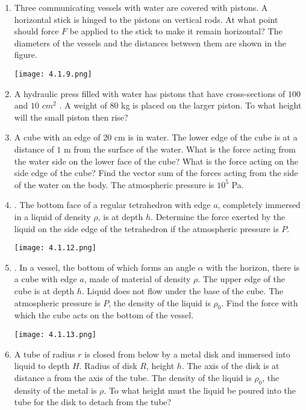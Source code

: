 \documentclass{article}
\begin{document}
\begin{enumerate}[label=4.1.\arabic*]
\item Three communicating vessels with water are covered with pistons. A horizontal stick is hinged to the pistons on vertical rods. At what point should force $F$ be applied to the stick to make it remain horizontal? The diameters of the vessels and the distances between them are shown in the figure. 
\begin{center}
    \texttt{[image: 4.1.9.png]}
\end{center}

\item A hydraulic press filled with water has pistons that have cross-sections of $100$ and $10$ $cm^2$ . A weight of $80$ kg is placed on the larger piston. To what height will the small piston then rise?  




\item A cube with an edge of $20$ cm is in water. The lower edge of the cube is at a distance of $1$ m from the surface of the water. What is the force acting from the water side on the lower face of the cube? What is the force acting on the side edge of the cube? Find the vector sum of the forces acting from the side of the water on the body. The atmospheric pressure is $10^5$ Pa.    
\item . The bottom face of a regular tetrahedron with edge $a$, completely immersed in a liquid of density $\rho$, is at depth $h$. Determine the force exerted by the liquid on the side edge of the tetrahedron if the atmospheric pressure is $P$. 
\begin{center}
    \texttt{[image: 4.1.12.png]}
\end{center}
\item . In a vessel, the bottom of which forms an angle $\alpha$ with the horizon, there is a cube with edge $a$, made of material of density $\rho$. The upper edge of the cube is at depth $h$. Liquid does not flow under the base of the cube. The atmospheric pressure is $P$, the density of the liquid is $\rho_0$. Find the force with which the cube acts on the bottom of the vessel.  


\begin{center}
    \texttt{[image: 4.1.13.png]}
\end{center}

\item A tube of radius $r$ is closed from below by a metal disk and immersed into liquid to depth $H$. Radius of disk $R$, height $h$. The axis of the disk is at distance a from the axis of the tube. The density of the liquid is $\rho_0$, the density of the metal is $\rho$. To what height must the liquid be poured into the tube for the disk to detach from the tube? 


\end{enumerate}
\end{document}
